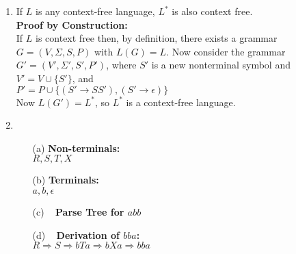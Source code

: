 \documentclass[a4paper, 12pt]{article}
\begin{document}
\begin{enumerate}
\item
If $L$ is any context-free language, $L^*$ is also context free.\\
\textbf{Proof by Construction:}\\
If $L$ is context free then, by definition, there exists a grammar $G = (V, \Sigma, S, P)$ with $L(G) = L$. Now consider the grammar $G' = (V', \Sigma', S', P')$, where $S'$ is a new nonterminal symbol and\\
$V' = V \cup \{S'\}$, and\\
$P' = P \cup \{(S' \rightarrow SS'), (S' \rightarrow \epsilon)\}$\\

Now $L(G') = L^*$, so $L^*$ is a context-free language.


\newpage
\item 
\begin{itemize}
\item[(a)]
\textbf{Non-terminals:}\\
$R, S, T, X$

\item[(b)]
\textbf{Terminals:}\\
$a, b, \epsilon$

\newpage
\item[(c)] ~
\textbf{Parse Tree for $abb$}
\begin{figure}[H]
	\centering
\end{figure}


\item[(d)] ~
\textbf{Derivation of $bba$:}\\
$R \Rightarrow S \Rightarrow bTa \Rightarrow bXa \Rightarrow bba$

\end{itemize}


\end{enumerate}
\end{document}
